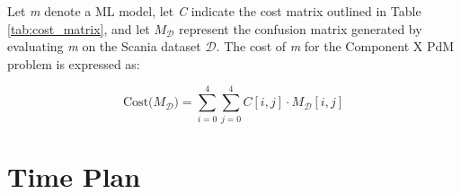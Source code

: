 \documentclass[a4paper,12pt]{article}
\begin{document}
\noindent Let \textit{m} denote a ML model, let \textit{C} indicate the cost matrix outlined in Table \ref{tab:cost_matrix}, and let $\mathit{M_{ \mathcal{D}}}$ represent the confusion matrix generated by evaluating \textit{m} on the Scania dataset $ \mathcal{D}$.
The cost of \textit{m} for the Component X PdM problem is expressed as:

\begin{equation} \text{Cost($\mathit{M_{ \mathcal{D}}}$)} = \sum_{i=0}^{4} \sum_{j=0}^{4} C[i,j] \cdot M_{ \mathcal{D}}[i,j] 
\label{eq:challege-metric}
\end{equation}

\section{Time Plan}
\end{document}
